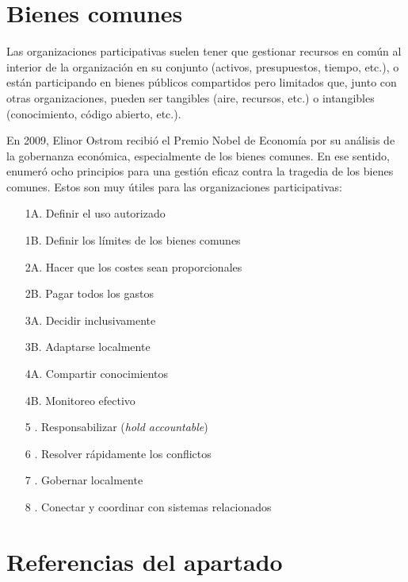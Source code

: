 \section{Bienes comunes}
\label{sec:org695eb10}

Las organizaciones participativas suelen tener que gestionar recursos en común al interior de la organización en su conjunto (activos, presupuestos, tiempo, etc.), o están participando en bienes públicos compartidos pero limitados que, junto con otras organizaciones, pueden ser tangibles (aire, recursos, etc.) o intangibles (conocimiento, código abierto, etc.).

En 2009, Elinor Ostrom recibió el Premio Nobel de Economía por su análisis de la gobernanza económica, especialmente de los bienes comunes. En ese sentido, enumeró ocho principios para una gestión eficaz contra la tragedia de los bienes comunes. Estos son muy útiles para las organizaciones participativas:

\begin{enumerate}
	\item[1A.] Definir el uso autorizado

	\item[1B.] Definir los límites de los bienes comunes

	\item[2A.] Hacer que los costes sean proporcionales

	\item[2B.] Pagar todos los gastos

	\item[3A.] Decidir inclusivamente

	\item[3B.] Adaptarse localmente

	\item[4A.] Compartir conocimientos

	\item[4B.] Monitoreo efectivo

	\item[5 .] Responsabilizar (\emph{hold accountable})

	\item[6 .] Resolver rápidamente los conflictos

	\item[7 .] Gobernar localmente

	\item[8 .] Conectar y coordinar con sistemas relacionados
\end{enumerate}

\section{Referencias del apartado}
\label{sec:ref07}

